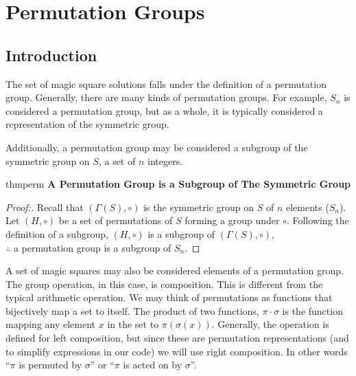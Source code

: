 \documentclass[12pt]{report}
\begin{document}
\chapter{Permutation Groups}

\section{Introduction}

\par The set of magic square solutions falls under the definition of a permutation group.
Generally, there are many kinds of permutation groups. For example, $S_n$ is considered a permutation
group, but as a whole, it is typically considered a representation of the symmetric group.


\par Additionally, a permutation group may be considered a subgroup of the symmetric group on $S$,
a set of $n$ integers.

\singlespacing{}
\begin{thmbox}{}{thmperm}
  \textbf{A Permutation Group is a Subgroup of The Symmetric Group}
  \begin{proof}[Proof:]
    Recall that $\left(\varGamma\left(S\right), \circ \right)$ is the symmetric group on $S$ of $n$
    elements ($S_n$). Let $\left(H,\circ\right)$ be a set of permutations of $S$ forming a group
    under
    $\circ$. Following the definition of a subgroup, $\left(H,\circ\right)$ is a subgroup of
    $\left(\varGamma\left(S\right), \circ \right)$,\\ $\therefore$ a permutation group is a
    subgroup of
    $S_n$.
  \end{proof}
\end{thmbox}
\doublespacing{}

\par A set of magic squares may also be considered elements of a permutation group. The group operation, in
this case, is composition. This is different from the typical arithmetic operation. We may think of 
permutations as functions that bijectively map a set to itself. The product of two functions, 
$\pi\cdot\sigma$ is the function mapping any element $x$ in
the set to $\pi\left(\sigma\left(x\right)\right)$. Generally, the operation is defined for left
composition, but since these are permutation representations (and to simplify expressions in our
code) we will use right composition. In other words ``$\pi$ is permuted by $\sigma$'' or ``$\pi$
is acted on by $\sigma$''.
\end{document}
